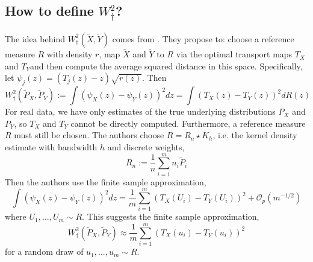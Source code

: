 \documentclass[11pt, a4paper, fleqn]{article}
\let\normalint\int %
\def\int{\displaystyle\normalint} %
\numberwithin{equation}{section}
\numberwithin{figure}{section}
\numberwithin{table}{section}
\begin{document}
\subsection{How to define $W_\dagger^2$?}
The idea behind $W_\dagger^2(\tilde{X}, \tilde{Y})$ comes from \cite{wang2013linear}. They propose to: choose a reference measure $R$ with density $r$, map $\tilde{X}$ and $\tilde{Y}$ to $R$ via the optimal transport maps $T_X$ and $T_Y$and then compute the average squared distance in this space. Specifically, let $\psi_j(z) = (T_j(z) - z)\sqrt{r(z)}$. Then 
\begin{equation}
W_\dagger^2(\tilde{P}_X, \tilde{P}_Y) := \int (\psi_X(z) - \psi_Y(z))^2 dz = \int (T_X(z) - T_Y(z))^2 dR(z)
\end{equation}
For real data, we have only estimates of the true underlying distributions $P_X$ and $P_Y$, so $T_X$ and $T_Y$ cannot be directly computed. Furthermore, a reference measure $R$ must still be chosen. The authors choose $R = R_n \star K_h$, i.e. the kernel density estimate with bandwidth $h$ and discrete weights,
\begin{equation}
R_n := \frac{1}{n} \sum\limits_{i=1}^m n_i \tilde{P}_i 
\end{equation}
Then the authors use the finite sample approximation,
\begin{equation}
 \int (\psi_X(z) - \psi_Y(z))^2 dz = \frac{1}{m} \sum\limits_{i=1}^m (T_X(U_i) - T_Y(U_i))^2 + \mathcal{O}_p(m^{-1/2}) 
\end{equation}
where $U_1, ..., U_m \sim R$. This suggests the finite sample approximation,
\begin{equation}
W_\dagger^2(\tilde{P}_X, \tilde{P}_Y) \approx \frac{1}{m} \sum\limits_{i=1}^m (T_X(u_i) - T_Y(u_i))^2
\end{equation}
for a random draw of $u_1, ..., u_m \sim R$.
\end{document}
